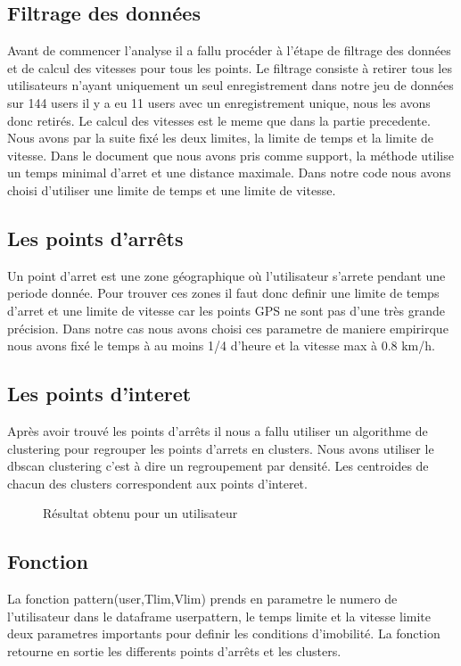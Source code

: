 \documentclass{article}
\begin{document}
\subsection{Filtrage des données}
Avant de commencer l'analyse il a fallu procéder à l'étape de filtrage des données et de calcul des vitesses pour tous les points.
Le filtrage consiste à retirer tous les utilisateurs n'ayant uniquement un seul enregistrement dans notre jeu de données sur 144 users il y a eu 11 users avec un enregistrement unique, nous les avons donc retirés.
Le calcul des vitesses est le meme que dans la partie precedente. 
Nous avons par la suite fixé les deux limites, la limite de temps et la limite de vitesse.
Dans le document que nous avons pris comme support, la méthode utilise un temps minimal d'arret et une distance maximale. Dans notre code nous avons choisi d'utiliser une limite de temps et une limite de vitesse. 
\subsection{Les points d'arrêts}
Un point d'arret est une zone géographique où l'utilisateur s'arrete pendant une periode donnée. Pour trouver ces zones il faut donc definir une limite de temps d'arret et une limite de vitesse car les points GPS ne sont pas d'une très grande précision. Dans notre cas nous avons choisi ces parametre de maniere empirirque nous avons fixé le temps à au moins 1/4 d'heure et la vitesse max à 0.8 km/h.
\subsection{Les points d'interet}
Après avoir trouvé les points d'arrêts il nous a fallu utiliser un algorithme de clustering pour regrouper les points d'arrets en clusters.
Nous avons utiliser le dbscan clustering c'est à dire un regroupement par densité. 
Les centroides de chacun des clusters correspondent aux points d'interet.

\begin{figure}[!h]
  \centering{}
 \captionsetup{justification=centering}
    \caption{Résultat obtenu pour un utilisateur}
\end{figure}
\subsection{Fonction}
La fonction pattern(user,Tlim,Vlim) prends en parametre le numero de l'utilisateur dans le dataframe userpattern, le temps limite et la vitesse limite deux parametres importants pour definir les conditions d'imobilité. 
La fonction retourne en sortie les differents points d'arrêts et les clusters. 
\end{document}
